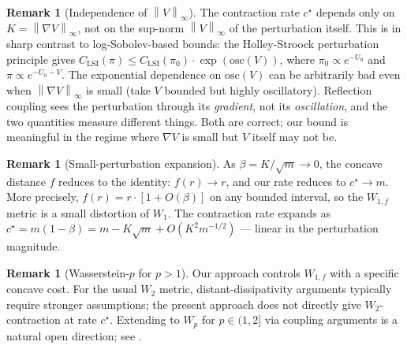 \documentclass[11pt]{article}
\theoremstyle{definition}
\newtheorem{remark}[theorem]{Remark}
\newcommand{\norm}[1]{\left\lVert #1 \right\rVert}
\begin{document}
\begin{remark}[Independence of $\norm{V}_\infty$]
The contraction rate $c^\star$ depends only on $K = \norm{\nabla V}_\infty$, not on the sup-norm $\norm{V}_\infty$ of the perturbation itself. This is in sharp contrast to log-Sobolev-based bounds: the Holley-Stroock perturbation principle \cite{HolleyStroock1987} gives $C_{\mathrm{LSI}}(\pi) \le C_{\mathrm{LSI}}(\pi_0)\cdot \exp(\mathrm{osc}(V))$, where $\pi_0 \propto e^{-U_0}$ and $\pi \propto e^{-U_0 - V}$. The exponential dependence on $\mathrm{osc}(V)$ can be arbitrarily bad even when $\norm{\nabla V}_\infty$ is small (take $V$ bounded but highly oscillatory). Reflection coupling sees the perturbation through its \emph{gradient}, not its \emph{oscillation}, and the two quantities measure different things. Both are correct; our bound is meaningful in the regime where $\nabla V$ is small but $V$ itself may not be.
\end{remark}

\begin{remark}[Small-perturbation expansion]
As $\beta = K/\sqrt m \to 0$, the concave distance $f$ reduces to the identity: $f(r) \to r$, and our rate reduces to $c^\star \to m$. More precisely, $f(r) = r\cdot[1 + O(\beta)]$ on any bounded interval, so the $W_{1,f}$ metric is a small distortion of $W_1$. The contraction rate expands as $c^\star = m(1 - \beta) = m - K\sqrt m + O(K^2 m^{-1/2})$ — linear in the perturbation magnitude.
\end{remark}

\begin{remark}[Wasserstein-$p$ for $p > 1$]
Our approach controls $W_{1,f}$ with a specific concave cost. For the usual $W_2$ metric, distant-dissipativity arguments typically require stronger assumptions; the present approach does not directly give $W_2$-contraction at rate $c^\star$. Extending to $W_p$ for $p \in (1, 2]$ via coupling arguments is a natural open direction; see \cite{LuoWang2016}.
\end{remark}
\end{document}
